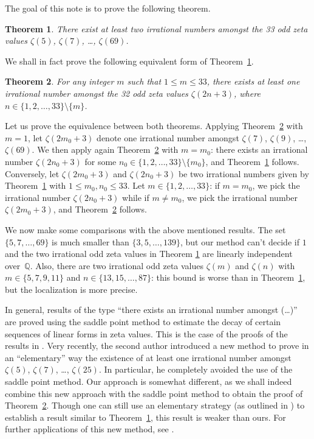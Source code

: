 \documentclass[reqno,12pt]{article}
\newtheorem{theo}{Theorem}
\theoremstyle{remark}
\begin{document}
The goal of this note is to prove the following theorem. 
\begin{theo}\label{theo:2} There exist at least two irrational numbers amongst the \textup{33} odd zeta values $\zeta(5)$, $\zeta(7)$, \ldots, $\zeta(69)$. 
\end{theo}
We shall in fact prove the following equivalent form of Theorem~\ref{theo:2}.
\begin{theo}\label{theo:1} For any integer $m$ such that $1\le m \le 33$, there exists at least one irrational number amongst the \textup{32} odd zeta values $\zeta(2n+3)$, where $n\in\{1,2,\ldots, 33\}\setminus\{m\}$.
\end{theo}
Let us prove the equivalence between both theorems. Applying Theorem~\ref{theo:1} with $m=1$,  let $\zeta(2m_0+3)$ denote one irrational number amongst $\zeta(7)$, $\zeta(9)$, \ldots , $\zeta(69)$. We then apply again Theorem~\ref{theo:1} with $m=m_0$: there exists an  irrational number $\zeta(2n_0+3)$ for some $n_0\in\{1,2,\ldots, 33\}\setminus\{m_0\}$, and Theorem~\ref{theo:2} follows. Conversely, let $\zeta(2m_0+3)$ and $\zeta(2n_0+3)$ be two irrational numbers given by Theorem~\ref{theo:2} with $1\le m_0, n_0\le 33$. Let $m\in \{1,2,\ldots,33\}$: if $m=m_0$, we pick the irrational number $\zeta(2n_0+3)$ while if $m\neq m_0$, we pick the irrational number $\zeta(2m_0+3)$, and Theorem~\ref{theo:1} follows. 


We now make some comparisons with  the above mentioned results. The set $\{5, 7, \ldots, 69\}$ is much smaller than $\{3, 5, \ldots, 139\}$, but our  method can't decide if $1$ and the two irrational odd zeta values in Theorem \ref{theo:2} are linearly independent over~$\mathbb Q$. 
Also, there are two irrational odd zeta values $\zeta(m)$ and $\zeta(n)$ with $m\in \{5,7,9,11\}$ and $n\in \{13, 15, \ldots , 87\}$: this bound is worse than in Theorem~\ref{theo:2}, but the  localization is more precise.




In general, results of the type ``there exists an irrational number amongst (\dots)'' are proved using the saddle point method to estimate the decay of certain sequences of linear forms in zeta values. This is the case of the proofs of the results in \cite{ri2, zud1, zud3}. Very recently, the second author introduced a new method to prove in an ``elementary'' way the existence of at least one irrational number amongst  $\zeta(5)$, $\zeta(7)$,  \ldots, $\zeta(25)$. In particular, he completely avoided the use of the saddle point method. 
Our approach is somewhat different, as we shall indeed combine this new approach with the saddle point method  to obtain the proof of Theorem~\ref{theo:1}. Though one can still use an elementary strategy (as outlined in \cite{sprang}) to establish a result similar to Theorem~\ref{theo:2}, this  result is weaker than ours. For further applications of this new method, see \cite{kratzud, sprang}.
\end{document}
